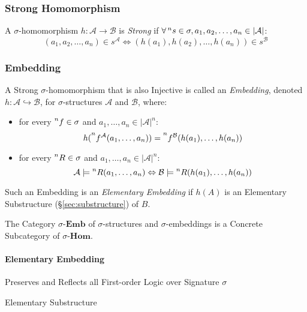 \subsubsection{Strong Homomorphism}\label{sec:strong_homomorphism}

A $\sigma$-homomorphism $h : \mathcal{A} \rightarrow \mathcal{B}$ is
\emph{Strong} if $\forall \prescript{n}{}{s} \in \sigma, a_1,
a_2,\ldots, a_n \in |\mathcal{A}|$:
\[
  (a_1, a_2,\ldots, a_n) \in s^\mathcal{A} \Leftrightarrow
  (h(a_1), h(a_2),\ldots,h(a_n)) \in s^\mathcal{B}
\]



\subsubsection{Embedding}\label{sec:embedding}

A Strong $\sigma$-homomorphism that is also Injective is called an
\emph{Embedding}, denoted $h : \mathcal{A} \hookrightarrow
\mathcal{B}$, for $\sigma$-structures $\mathcal{A}$ and $\mathcal{B}$,
where:
\begin{itemize}
\item for every $\prescript{n}{}{f} \in \sigma$ and $a_1, \ldots, a_n
  \in |\mathcal{A}|^n$:
  \[
    h(\prescript{n}{}{f^\mathcal{A}}(a_1,\ldots,a_n)) =
    \prescript{n}{}{f^\mathcal{B}}(h(a_1),\ldots,h(a_n))
  \]
\item for every $\prescript{n}{}{R} \in \sigma$ and $a_1, \ldots, a_n
  \in |\mathcal{A}|^n$:
  \[
    \mathcal{A} \models \prescript{n}{}{R}(a_1, \ldots, a_n)
    \Leftrightarrow \mathcal{B} \models \prescript{n}{}{R}(h(a_1),
    \ldots, h(a_n))
  \]
\end{itemize}
Such an Embedding is an \emph{Elementary Embedding} if $h(A)$ is an
Elementary Substructure (\S\ref{sec:substructure}) of $B$.

The Category $\sigma$-$\mathbf{Emb}$ of $\sigma$-structures and
$\sigma$-embeddings is a Concrete Subcategory of
$\sigma$-$\mathbf{Hom}$.



\paragraph{Elementary Embedding}\label{sec:elementary_embedding}\hfill

Preserves and Reflects all First-order Logic over Signature $\sigma$

Elementary Substructure



